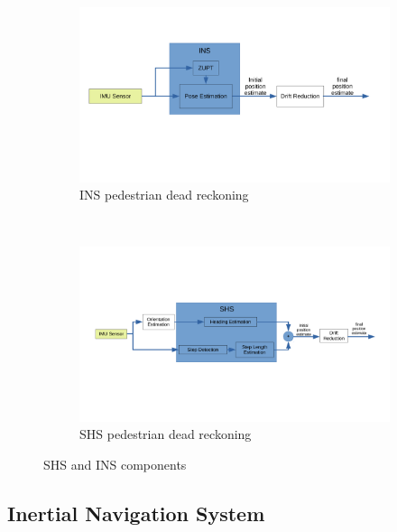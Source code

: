 \begin{figure}[H]
	\centering
	\begin{subfigure}[t]{.8\textwidth}
		\centering
		\includegraphics[trim=20 140 50 80, clip, width=\linewidth]{images/INS_diagram}
		\caption{\ac{INS} pedestrian dead reckoning}
		\label{fig:ins_diagram}
	\end{subfigure}\\
	\begin{subfigure}[t]{0.9\textwidth}
		\centering
		\includegraphics[trim=40 120 40 80, clip,width=\linewidth]{images/shs_diagram}
		\caption{\ac{SHS} pedestrian dead reckoning}
		\label{fig:shs_diagram}
	\end{subfigure}
	\caption{SHS and INS components}
	\label{fig:SHS_INS_diagrams}
\end{figure}
  \newpage   
\subsection{Inertial Navigation System}
\label{sec:INS}

